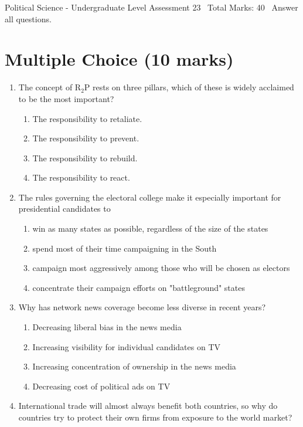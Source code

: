 \documentclass[12pt]{article}
\begin{document}
\begin{center}
Political Science - Undergraduate Level Assessment 23 \
Total Marks: 40 \
Answer all questions.
\end{center}

\section*{Multiple Choice (10 marks)}
\begin{enumerate}[label=\arabic*.]
\item The concept of R$_{2}$P rests on three pillars, which of these is widely acclaimed to be the most important?
\begin{enumerate}[label=(\alph*)]
    \item The responsibility to retaliate.
    \item The responsibility to prevent.
    \item The responsibility to rebuild.
    \item The responsibility to react.
\end{enumerate}
\item The rules governing the electoral college make it especially important for presidential candidates to
\begin{enumerate}[label=(\alph*)]
    \item win as many states as possible, regardless of the size of the states
    \item spend most of their time campaigning in the South
    \item campaign most aggressively among those who will be chosen as electors
    \item concentrate their campaign efforts on "battleground" states
\end{enumerate}
\item Why has network news coverage become less diverse in recent years?
\begin{enumerate}[label=(\alph*)]
    \item Decreasing liberal bias in the news media
    \item Increasing visibility for individual candidates on TV
    \item Increasing concentration of ownership in the news media
    \item Decreasing cost of political ads on TV
\end{enumerate}
\item International trade will almost always benefit both countries, so why do countries try to protect their own firms from exposure to the world market?

\end{enumerate}
\end{document}
